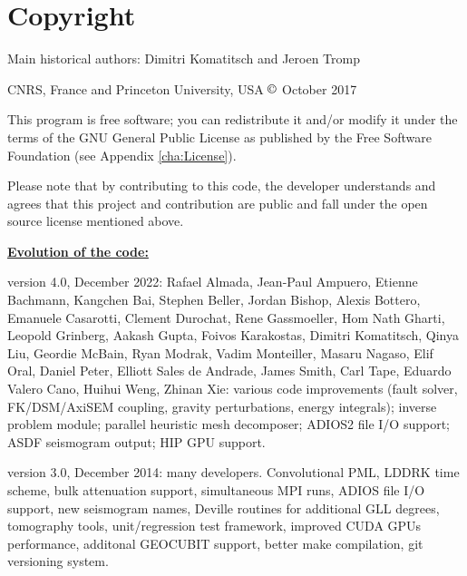 
\chapter*{Copyright}

Main historical authors: Dimitri Komatitsch and Jeroen Tromp

CNRS, France and Princeton University, USA\newline
$\copyright$ October 2017\newline

\noindent
This program is free software; you can redistribute it and/or modify
it under the terms of the GNU General Public License as published
by the Free Software Foundation (see Appendix \ref{cha:License}).\newline

\noindent
Please note that by contributing to this code, the developer understands and agrees that this project and contribution
are public and fall under the open source license mentioned above.\newline

\noindent
\textbf{\underline{Evolution of the code:}}\newline

version 4.0, December 2022:
Rafael Almada, Jean-Paul Ampuero, Etienne Bachmann, Kangchen Bai, Stephen Beller, Jordan Bishop, Alexis Bottero,
Emanuele Casarotti, Clement Durochat, Rene Gassmoeller, Hom Nath Gharti, Leopold Grinberg, Aakash Gupta,
Foivos Karakostas, Dimitri Komatitsch, Qinya Liu, Geordie McBain, Ryan Modrak, Vadim Monteiller, Masaru Nagaso, Elif Oral,
Daniel Peter, Elliott Sales de Andrade,  James Smith, Carl Tape, Eduardo Valero Cano, Huihui Weng, Zhinan Xie:
various code improvements (fault solver, FK/DSM/AxiSEM coupling, gravity perturbations, energy integrals);
inverse problem module; parallel heuristic mesh decomposer; ADIOS2 file I/O support;
ASDF seismogram output; HIP GPU support.\newline


version 3.0, December 2014: many developers.
Convolutional PML, LDDRK time scheme, bulk attenuation support, simultaneous MPI runs,
ADIOS file I/O support, new seismogram names,
Deville routines for additional GLL degrees, tomography tools, unit/regression test framework,
improved CUDA GPUs performance, additonal GEOCUBIT support, better make compilation,
git versioning system. \newline


